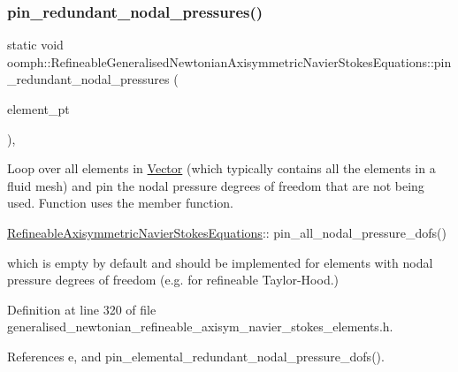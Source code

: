 \subsubsection{\texorpdfstring{pin\+\_\+redundant\+\_\+nodal\+\_\+pressures()}{pin\_redundant\_nodal\_pressures()}}
{\footnotesize\ttfamily static void oomph\+::\+Refineable\+Generalised\+Newtonian\+Axisymmetric\+Navier\+Stokes\+Equations\+::pin\+\_\+redundant\+\_\+nodal\+\_\+pressures (\begin{DoxyParamCaption}\item[{const \hyperlink{classoomph_1_1Vector}{Vector}$<$ \hyperlink{classoomph_1_1GeneralisedElement}{Generalised\+Element} $\ast$$>$ \&}]{element\+\_\+pt }\end{DoxyParamCaption})\hspace{0.3cm}{\ttfamily [inline]}, {\ttfamily [static]}}



Loop over all elements in \hyperlink{classoomph_1_1Vector}{Vector} (which typically contains all the elements in a fluid mesh) and pin the nodal pressure degrees of freedom that are not being used. Function uses the member function. 


\begin{DoxyItemize}
\item {\ttfamily \hyperlink{classoomph_1_1RefineableAxisymmetricNavierStokesEquations}{Refineable\+Axisymmetric\+Navier\+Stokes\+Equations}\+:}\+: pin\+\_\+all\+\_\+nodal\+\_\+pressure\+\_\+dofs()
\end{DoxyItemize}which is empty by default and should be implemented for elements with nodal pressure degrees of freedom (e.\+g. for refineable Taylor-\/\+Hood.) 

Definition at line 320 of file generalised\+\_\+newtonian\+\_\+refineable\+\_\+axisym\+\_\+navier\+\_\+stokes\+\_\+elements.\+h.



References e, and pin\+\_\+elemental\+\_\+redundant\+\_\+nodal\+\_\+pressure\+\_\+dofs().

\mbox{\label{classoomph_1_1RefineableGeneralisedNewtonianAxisymmetricNavierStokesEquations_a626f83e867f6d2fda5d9ed20a265c6ca}} 
